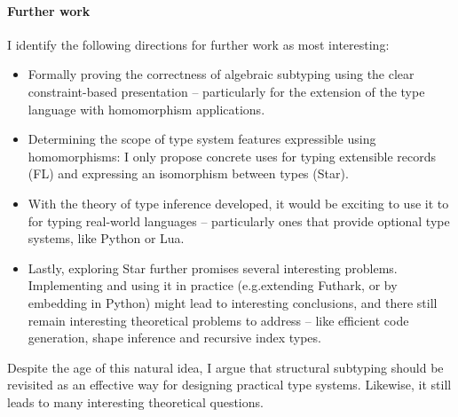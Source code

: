 \paragraph{Further work} I identify the following directions for further work as most interesting: \begin{itemize}
    \item Formally proving the correctness of algebraic subtyping using the clear constraint-based presentation -- particularly for the extension of the type language with homomorphism applications. 
    \item Determining the scope of type system features expressible using homomorphisms: I only propose concrete uses for typing extensible records (FL) and expressing an isomorphism between types (Star).
    \item With the theory of type inference developed, it would be exciting to use it to for typing real-world languages -- particularly ones that provide optional type systems, like Python or Lua.
    \item Lastly, exploring Star further promises several interesting problems. Implementing and using it in practice (e.g.\@ extending Futhark, or by embedding in Python) might lead to interesting conclusions, and there still remain interesting theoretical problems to address -- like efficient code generation, shape inference and recursive index types.
\end{itemize}

Despite the age of this natural idea, I argue that structural subtyping should be revisited as an effective way for designing practical type systems. Likewise, it still leads to many interesting theoretical questions.